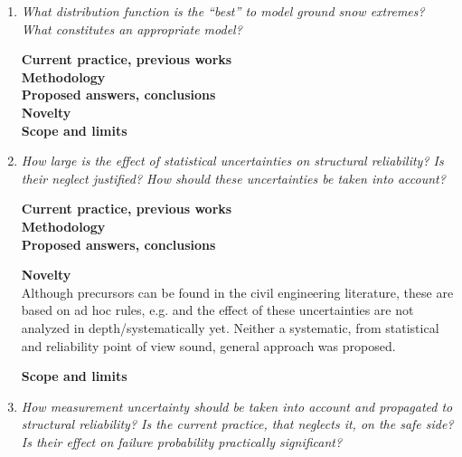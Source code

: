 \begin{enumerate}[leftmargin=*, align=left]
  \item \textit{What distribution function is the ``best'' to model ground snow extremes? What constitutes an appropriate model?}
  
    \textbf{Current practice, previous works} \\
    
    \textbf{Methodology} \\
  
    \textbf{Proposed answers, conclusions} \\
  
    \textbf{Novelty} \\

    \textbf{Scope and limits} \\
    


  \item \textit{How large is the effect of statistical uncertainties on structural reliability? Is their neglect justified? How should these uncertainties be taken into account?}

    \textbf{Current practice, previous works} \\

    \textbf{Methodology} \\

    \textbf{Proposed answers, conclusions}

    \textbf{Novelty} \\
    Although precursors can be found in the civil engineering literature, these are based on ad hoc rules, e.g. and the effect of these uncertainties are not analyzed in depth/systematically yet. Neither a systematic, from statistical and reliability point of view sound, general approach was proposed.

    \textbf{Scope and limits} \\
    
  
  \item \textit{How measurement uncertainty should be taken into account and propagated to structural reliability? Is the current practice, that neglects it, on the safe side? Is their effect on failure probability practically significant?}


\end{enumerate}
